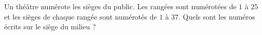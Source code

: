 
\begin{exercice}\label{exosmath-0477}

    Un théâtre numérote les sièges du public. Les rangées sont numérotées de \( 1\) à \( 25\) et les sièges de chaque rangée sont numérotés de \( 1\) à \( 37\). Quels sont les numéros écrits sur le siège du milieu ?

\end{exercice}
